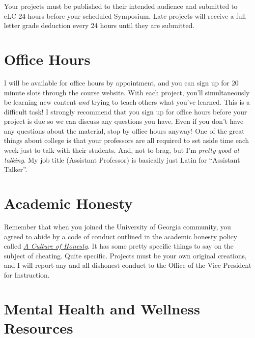 \documentclass[11pt, letterpaper]{article}
\begin{document}
\noindent Your projects must be published to their intended audience and submitted to eLC 24 hours before your scheduled Symposium. Late projects will receive a full letter grade deduction every 24 hours until they are submitted.

\section*{Office Hours}

I will be available for office hours by appointment, and you can sign up for 20 minute slots through the course website. With each project, you'll simultaneously be learning new content \textit{and} trying to teach others what you've learned. This is a difficult task! I strongly recommend that you sign up for office hours before your project is due so we can discuss any questions you have. Even if you don't have any questions about the material, stop by office hours anyway! One of the great things about college is that your professors are all required to set aside time each week just to talk with their students. And, not to brag, but I'm \textit{pretty good at talking}. My job title (Assistant Professor) is basically just Latin for ``Assistant Talker''.




\section*{Academic Honesty}

Remember that when you joined the University of Georgia community, you agreed to abide by a code of conduct outlined in the academic honesty policy called \href{https://honesty.uga.edu/Academic-Honesty-Policy/Introduction/}{\textit{A Culture of Honesty}}. It has some pretty specific things to say on the subject of cheating. Quite specific. Projects must be your own original creations, and I will report any and all dishonest conduct to the Office of the Vice President for Instruction.

\section*{Mental Health and Wellness Resources}
\end{document}

